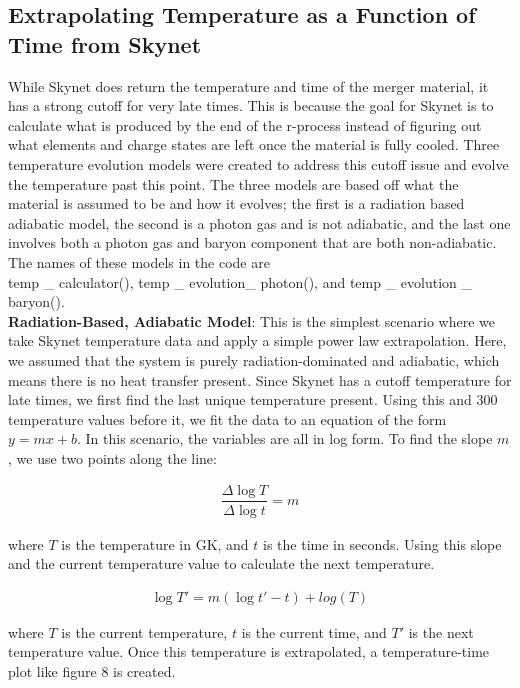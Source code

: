 \documentclass[11pt,a4paper]{article}
\begin{document}
\subsection{Extrapolating Temperature as a Function of Time from Skynet}

While Skynet does return the temperature and time of the merger material, it has a strong cutoff for very late times. This is because the goal for Skynet is to calculate what is produced by the end of the r-process instead of figuring out what elements and charge states are left once the material is fully cooled. Three temperature evolution models were created to address this cutoff issue and evolve the temperature past this point. The three models are based off what the material is assumed to be and how it evolves; the first is a radiation based adiabatic model, the second is a photon gas and is not adiabatic, and the last one involves both a photon gas and baryon component that are both non-adiabatic. The names of these models in the code are \\ temp \_ calculator(),  temp \_ evolution\_ photon(), and temp \_ evolution \_ baryon(). \\ 


\textbf{Radiation-Based, Adiabatic Model}: This is the simplest scenario where we take Skynet temperature data and apply a simple power law extrapolation. Here, we assumed that the system is purely radiation-dominated and adiabatic, which means there is no heat transfer present. Since Skynet has a cutoff temperature for late times, we first find the last unique temperature present. Using this and 300 temperature values before it, we fit the data to an equation of the form $y = mx + b$. In this scenario, the variables are all in log form. To find the slope $m$, we use two points along the line:

\begin{align}
	\dfrac{\Delta \log{T}}{\Delta \log{t}} = m 
\end{align}

where $T$ is the temperature in GK, and $t$ is the time in seconds. Using this slope and the current temperature value to calculate the next temperature. 

\begin{align}
	\log{T'} = m \left(\log{t' - t} \right) + log(T)
\end{align}

where $T$ is the current temperature, $t$ is the current time, and $T'$ is the next temperature value. Once this temperature is extrapolated, a temperature-time plot like figure 8 is created.  \\\\
\end{document}
